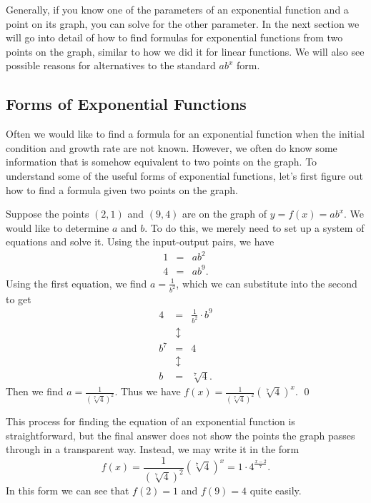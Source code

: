 \begin{eg}
Generally, if you know one of the parameters of an exponential function and a point on its graph, you can solve for the other parameter. In the next section we will go into detail of how to find formulas for exponential functions from two points on the graph, similar to how we did it for linear functions. We will also see possible reasons for alternatives to the standard $ab^x$ form.


\subsection{Forms of Exponential Functions}

Often we would like to find a formula for an exponential function when the initial condition and growth rate are not known. However, we often do know  some information that is somehow equivalent to two points on the graph. To understand some of the useful forms of exponential functions, let's first figure out how to find a formula given two points on the graph.

\par

\begin{eg} Suppose the points $(2,1)$ and $(9,4)$ are on the graph of $y=f(x) = ab^{x}$. We would like to determine $a$ and $b$. To do this, we merely need to set up a system of equations and solve it. Using the input-output pairs, we have
\begin{eqnarray*}
1 & = & ab^{2}\\
4 & = & ab^{9}.
\end{eqnarray*}
Using the first equation, we find $a = \frac{1}{b^2}$, which we can substitute into the second to get
\begin{eqnarray*}
4 & = & \frac{1}{b^2}\cdot b^{9}\\
 & \updownarrow & \\
b^{7} & = & 4 \\
& \updownarrow & \\
b & = & \sqrt[7]{4}.
\end{eqnarray*}
Then we find $a = \frac{1}{(\sqrt[7]{4})^{2}}$. Thus we have $f(x) = \frac{1}{(\sqrt[7]{4})^{2}} (\sqrt[7]{4})^x$. \qed \end{eg}

\par

This process for finding the equation of an exponential function is straightforward, but the final answer does not show the points the graph passes through in a transparent way. Instead, we may write it in the form 
\[
f(x)  = \frac{1}{(\sqrt[7]{4})^{2}} (\sqrt[7]{4})^x = 1\cdot 4^{\frac{x-2}{7}}.
\] 
In this form we can see that $f(2) = 1$ and $f(9) = 4$ quite easily. 


\end{eg}

